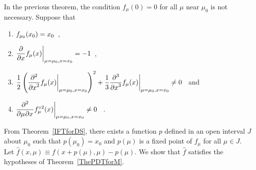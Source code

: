
\begin{rmk}
In the previous theorem, the condition $f_{\mu}(0)=0$ for all $\mu$
near $\mu_0$ is not necessary.  Suppose that
\begin{enumerate}
\item $\DS f_{\mu_0}(x_0) = x_0$\ ,
\item $\DS \pdfdx{f_{\mu}(x)}{x}\bigg|_{\mu=\mu_0,x=x_0} = -1$\ ,
\item $\DS \frac{1}{2}
\left(\pdfdxn{f_{\mu}(x)}{x}{2}\bigg|_{\mu=\mu_0,x=x_0}\right)^2
+\frac{1}{3} \pdfdxn{f_{\mu}(x)}{x}{3}\bigg|_{\mu=\mu_0,x=x_0} \neq 0$ \ 
and
\item $\DS \pdfdxnm{f_{\mu}^{\circ 2}(x)}{\mu}{x}{2}{}{}
\bigg|_{\mu=\mu_0,x=x_0} \neq 0$ \ .
\end{enumerate}
From Theorem~\ref{IFTforDS}, there exists a function
$p$ defined in an open interval $J$ about $\mu_0$ such that
$p(\mu_0)=x_0$ and $p(\mu)$ is a fixed point of $f_\mu$ for all $\mu \in J$.
Let $\hat{f}(x,\mu) \equiv f(x+p(\mu),\mu)-p(\mu)$.  We show that
$\hat{f}$ satisfies the hypotheses of Theorem~\ref{ThePDTforM}.


\end{rmk}
